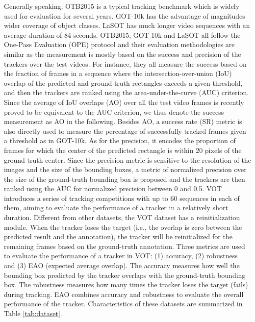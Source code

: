 \documentclass[journal]{IEEEtran}
\newcommand{\ie}{i.e.}
\renewcommand{\uline}{}
\begin{document}
Generally speaking, OTB2015 is a typical tracking benchmark which is widely used for evaluation for several years. GOT-10k has the advantage of magnitudes wider coverage of object classes. LaSOT has much longer video sequences with an average duration of 84 seconds. OTB2015, GOT-10k and LaSOT all follow the One-Pass Evaluation (OPE) protocol and their evaluation methodologies are similar as the measurement is mostly based on the success and precision of the trackers over the test videos. For instance, they all measure the success based on the fraction of frames in a sequence where the intersection-over-union (IoU) overlap of the predicted and \uline{ground-truth} rectangles exceeds a given threshold, and then the trackers are ranked using the area-under-the-curve (AUC) criterion. Since the average of IoU overlaps (AO) over all the test video frames is recently proved to be equivalent to the AUC criterion, we thus denote the success measurement as AO in the following. Besides AO, a success rate (SR) metric is also directly used to measure the percentage of successfully tracked frames given a threshold as in GOT-10k. As for the precision, it encodes the proportion of frames for which the center of the predicted rectangle is within 20 pixels of the \uline{ground-truth} center. Since the precision metric is sensitive to the resolution of the images and the size of the bounding boxes, a metric of normalized precision over the size of the \uline{ground-truth} bounding box is proposed and the trackers are then ranked using the AUC for normalized precision between 0 and 0.5. VOT \cite{VOT2016,VOT2018,VOT2019} introduces a series of tracking competitions with up to 60 sequences in each of them, aiming to evaluate the performance of a tracker in a relatively short duration. Different from other datasets, the VOT dataset has a reinitialization module. When the tracker loses the target (\ie, the overlap is zero between the predicted result and the annotation), the tracker will be reinitialized for the remaining frames based on the \uline{ground-truth} annotation. Three metrics are used to evaluate the performance of a tracker in VOT: (1) accuracy, (2) robustness and (3) EAO (expected average overlap). The accuracy measures how well the bounding box predicted by the tracker overlaps with the \uline{ground-truth} bounding box. The robustness measures how many times the tracker loses the target (fails) during tracking. EAO combines accuracy and robustness to evaluate the overall performance of the tracker. Characteristics of these datasets are summarized in Table \ref{tab:dataset}.
\end{document}
